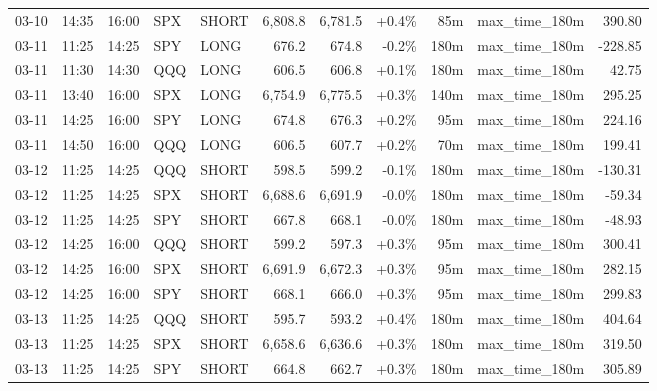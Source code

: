 \documentclass[11pt,a4paper,twoside]{article}
\begin{document}
\begin{center}
\begin{longtable}{>{\color{txtmain}}l l l l l r r r r >{\color{txtmain}}l r}
03-10 & 14:35 & 16:00 & SPX & SHORT & 6,808.8 & 6,781.5 & \textcolor{wingreen}{+0.4\%} & 85m & max\_time\_180m & \textcolor{wingreen}{390.80} \\
03-11 & 11:25 & 14:25 & SPY & LONG & 676.2 & 674.8 & \textcolor{lossred}{-0.2\%} & 180m & max\_time\_180m & \textcolor{lossred}{-228.85} \\
03-11 & 11:30 & 14:30 & QQQ & LONG & 606.5 & 606.8 & \textcolor{wingreen}{+0.1\%} & 180m & max\_time\_180m & \textcolor{wingreen}{42.75} \\
03-11 & 13:40 & 16:00 & SPX & LONG & 6,754.9 & 6,775.5 & \textcolor{wingreen}{+0.3\%} & 140m & max\_time\_180m & \textcolor{wingreen}{295.25} \\
03-11 & 14:25 & 16:00 & SPY & LONG & 674.8 & 676.3 & \textcolor{wingreen}{+0.2\%} & 95m & max\_time\_180m & \textcolor{wingreen}{224.16} \\
03-11 & 14:50 & 16:00 & QQQ & LONG & 606.5 & 607.7 & \textcolor{wingreen}{+0.2\%} & 70m & max\_time\_180m & \textcolor{wingreen}{199.41} \\
03-12 & 11:25 & 14:25 & QQQ & SHORT & 598.5 & 599.2 & \textcolor{lossred}{-0.1\%} & 180m & max\_time\_180m & \textcolor{lossred}{-130.31} \\
03-12 & 11:25 & 14:25 & SPX & SHORT & 6,688.6 & 6,691.9 & \textcolor{lossred}{-0.0\%} & 180m & max\_time\_180m & \textcolor{lossred}{-59.34} \\
03-12 & 11:25 & 14:25 & SPY & SHORT & 667.8 & 668.1 & \textcolor{lossred}{-0.0\%} & 180m & max\_time\_180m & \textcolor{lossred}{-48.93} \\
03-12 & 14:25 & 16:00 & QQQ & SHORT & 599.2 & 597.3 & \textcolor{wingreen}{+0.3\%} & 95m & max\_time\_180m & \textcolor{wingreen}{300.41} \\
03-12 & 14:25 & 16:00 & SPX & SHORT & 6,691.9 & 6,672.3 & \textcolor{wingreen}{+0.3\%} & 95m & max\_time\_180m & \textcolor{wingreen}{282.15} \\
03-12 & 14:25 & 16:00 & SPY & SHORT & 668.1 & 666.0 & \textcolor{wingreen}{+0.3\%} & 95m & max\_time\_180m & \textcolor{wingreen}{299.83} \\
03-13 & 11:25 & 14:25 & QQQ & SHORT & 595.7 & 593.2 & \textcolor{wingreen}{+0.4\%} & 180m & max\_time\_180m & \textcolor{wingreen}{404.64} \\
03-13 & 11:25 & 14:25 & SPX & SHORT & 6,658.6 & 6,636.6 & \textcolor{wingreen}{+0.3\%} & 180m & max\_time\_180m & \textcolor{wingreen}{319.50} \\
03-13 & 11:25 & 14:25 & SPY & SHORT & 664.8 & 662.7 & \textcolor{wingreen}{+0.3\%} & 180m & max\_time\_180m & \textcolor{wingreen}{305.89} \\

\end{longtable}
\end{center}
\end{document}

